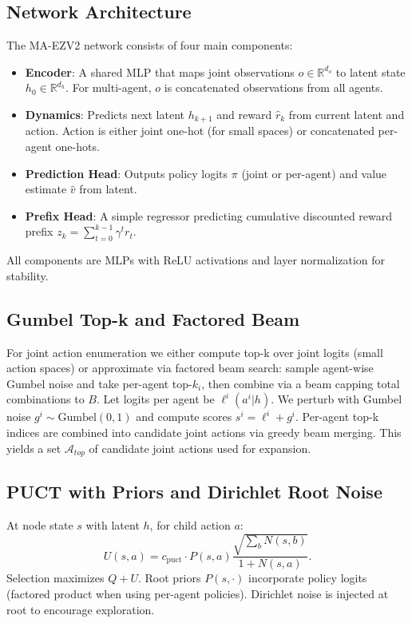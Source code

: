 \documentclass[10pt]{article}
\begin{document}
\subsection{Network Architecture}
The MA-EZV2 network consists of four main components:
\begin{itemize}
  \item \textbf{Encoder}: A shared MLP that maps joint observations $o \in \mathbb{R}^{d_o}$ to latent state $h_0 \in \mathbb{R}^{d_h}$. For multi-agent, $o$ is concatenated observations from all agents.
  \item \textbf{Dynamics}: Predicts next latent $h_{k+1}$ and reward $\hat{r}_k$ from current latent and action. Action is either joint one-hot (for small spaces) or concatenated per-agent one-hots.
  \item \textbf{Prediction Head}: Outputs policy logits $\pi$ (joint or per-agent) and value estimate $\hat{v}$ from latent.
  \item \textbf{Prefix Head}: A simple regressor predicting cumulative discounted reward prefix $z_k = \sum_{t=0}^{k-1} \gamma^t r_t$.
\end{itemize}
All components are MLPs with ReLU activations and layer normalization for stability.

\subsection{Gumbel Top-k and Factored Beam}
For joint action enumeration we either compute top-k over joint logits (small action spaces) or approximate via factored beam search: sample agent-wise Gumbel noise and take per-agent top-$k_i$, then combine via a beam capping total combinations to $B$. Let logits per agent be $\ell^i(a^i|h)$. We perturb with Gumbel noise $g^i\sim\text{Gumbel}(0,1)$ and compute scores $s^i=\ell^i+g^i$. Per-agent top-k indices are combined into candidate joint actions via greedy beam merging. This yields a set $\mathcal{A}_{top}$ of candidate joint actions used for expansion.

\subsection{PUCT with Priors and Dirichlet Root Noise}
At node state $s$ with latent $h$, for child action $a$:
\begin{equation}
U(s,a) = c_{\text{puct}} \cdot P(s,a)\frac{\sqrt{\sum_b N(s,b)}}{1+N(s,a)} .
\end{equation}
Selection maximizes $Q+U$. Root priors $P(s,\cdot)$ incorporate policy logits (factored product when using per-agent policies). Dirichlet noise is injected at root to encourage exploration.
\end{document}
